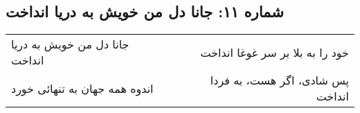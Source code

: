 \begin{center}
\section*{شماره ۱۱: جانا دل من خویش به دریا انداخت}
\label{sec:011}
\begin{longtable}{l p{0.5cm} r}
جانا دل من خویش به دریا انداخت
&&
خود را به بلا بر سر غوغا انداخت
\\
اندوه همه جهان به تنهائی خورد
&&
پس شادی، اگر هست، به فردا انداخت
\\
\end{longtable}
\end{center}
